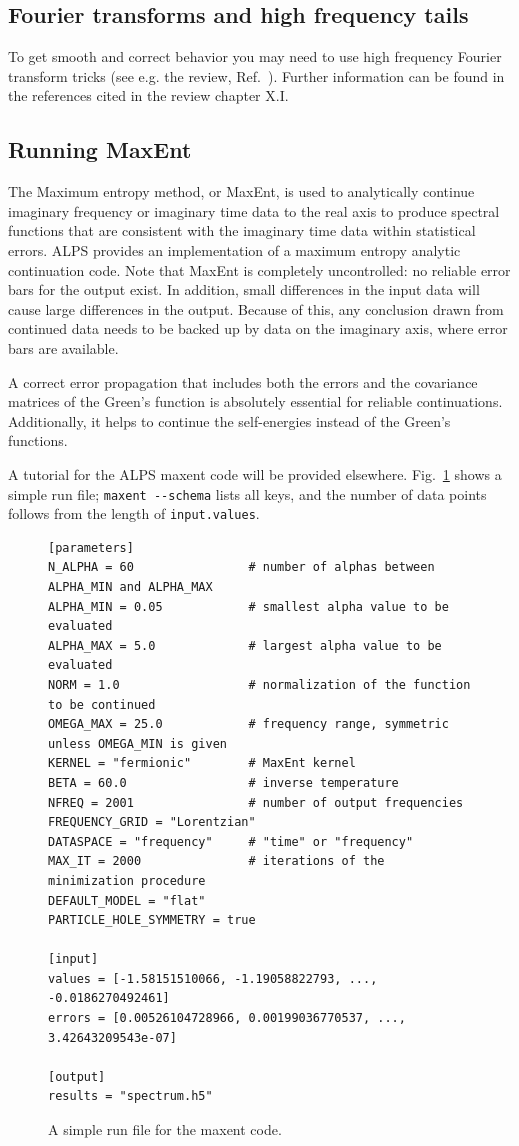 \documentclass[aps,prb,floatfix,superscriptaddress,twocolumn,notitlepage]{revtex4-1}
\begin{document}
\subsection{Fourier transforms and high frequency tails}
To get smooth and correct behavior you may need to use high frequency Fourier transform tricks (see e.g. the review, Ref.~). Further information can be found in the references cited in the review chapter X.I.

\subsection{Running MaxEnt}
The Maximum entropy method, or MaxEnt, is used to analytically continue imaginary frequency or imaginary time data to the real axis to produce spectral functions that are consistent with the imaginary time data within  statistical errors.\cite{Jarrell96} ALPS provides an implementation of a maximum entropy analytic continuation code. Note that MaxEnt is completely uncontrolled: no reliable error bars for the output exist. In addition, small differences in the input data will cause large differences in the output. Because of this, any conclusion drawn from continued data needs to be backed up by data on the imaginary axis, where error bars are available.

A correct error propagation that includes both the errors and the covariance matrices of the Green's function is absolutely essential for reliable continuations. Additionally, it helps to continue the self-energies instead of the Green's functions\cite{Wang09gap}.

A tutorial for the ALPS maxent code will be provided elsewhere. Fig.~\ref{pfile} shows a simple run file; \verb#maxent --schema# lists all keys, and the number of data points follows from the length of \verb#input.values#.

\begin{figure}
\begin{verbatim}
[parameters]
N_ALPHA = 60                # number of alphas between ALPHA_MIN and ALPHA_MAX
ALPHA_MIN = 0.05            # smallest alpha value to be evaluated
ALPHA_MAX = 5.0             # largest alpha value to be evaluated
NORM = 1.0                  # normalization of the function to be continued
OMEGA_MAX = 25.0            # frequency range, symmetric unless OMEGA_MIN is given
KERNEL = "fermionic"        # MaxEnt kernel
BETA = 60.0                 # inverse temperature
NFREQ = 2001                # number of output frequencies
FREQUENCY_GRID = "Lorentzian"
DATASPACE = "frequency"     # "time" or "frequency"
MAX_IT = 2000               # iterations of the minimization procedure
DEFAULT_MODEL = "flat"
PARTICLE_HOLE_SYMMETRY = true

[input]
values = [-1.58151510066, -1.19058822793, ..., -0.0186270492461]
errors = [0.00526104728966, 0.00199036770537, ..., 3.42643209543e-07]

[output]
results = "spectrum.h5"
\end{verbatim}
\caption{A simple run file for the maxent code.\label{pfile}}
\end{figure}
\end{document}
